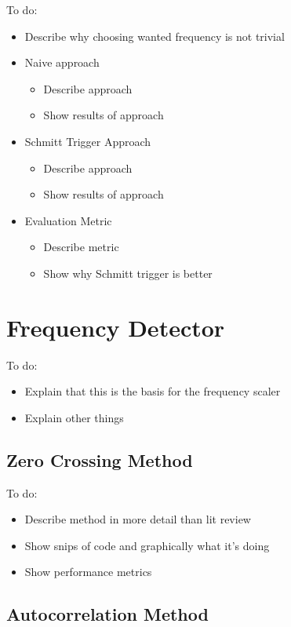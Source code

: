 \color{red}
To do:
\begin{itemize}
	\item Describe why choosing wanted frequency is not trivial
	\item Naive approach
	\begin{itemize}
		\item Describe approach
		\item Show results of approach
	\end{itemize}
	\item Schmitt Trigger Approach
	\begin{itemize}
		\item Describe approach
		\item Show results of approach
	\end{itemize}
	\item Evaluation Metric
	\begin{itemize}
		\item Describe metric
		\item Show why Schmitt trigger is better
	\end{itemize}
\end{itemize}
\color{black}

\section{Frequency Detector}

\color{red}
To do:
\begin{itemize}
	\item Explain that this is the basis for the frequency scaler
	\item Explain other things
\end{itemize}
\color{black}

\subsection{Zero Crossing Method}

\color{red}
To do:
\begin{itemize}
	\item Describe method in more detail than lit review
	\item Show snips of code and graphically what it's doing
	\item Show performance metrics
\end{itemize}
\color{black}

\subsection{Autocorrelation Method}

